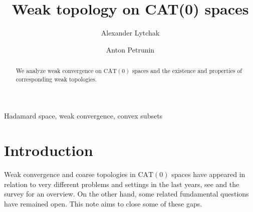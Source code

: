 \documentclass[12pt,leqno]{amsart}
\numberwithin{equation}{section}
\theoremstyle{remark}
\newcommand{\CAT}{\mathrm{CAT}}
\begin{document}
	\pagebreak
	
	
	\title{Weak topology on CAT(0) spaces}
	
	
	
	\author{Alexander Lytchak}

\author{Anton Petrunin}	
	
	\keywords
	{Hadamard space, weak convergence, convex subsets} 
	
	
	
	
	
	\begin{abstract}
	We analyze weak convergence on $\CAT(0)$ spaces and the existence and properties of corresponding weak topologies.
	\end{abstract}
	
	
	
	
	
	
	
	
	\maketitle

\section{Introduction}
Weak convergence and coarse topologies in $\CAT(0)$ spaces have appeared in relation to very different problems and settings in the last years, see \cite{Jost,Monod,Kirk,Bac3,Kell,Streets,Darvas} and the survey \cite{Bac} for an overview.
On the other hand, some related fundamental questions have remained open.
This note aims to close some of these gaps. 
\end{document}
